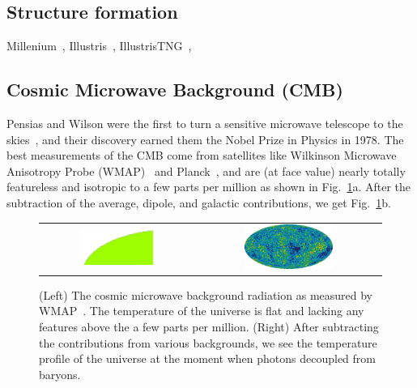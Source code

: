 \subsection{Structure formation}

Millenium~\cite{Springel:2005nw}, Illustris~\cite{Genel:2014lma,Vogelsberger:2014dza,Sijacki:2014yfa}, IllustrisTNG~\cite{Pillepich:2017jle},

\subsection{Cosmic Microwave Background (CMB)}

Pensias and Wilson were the first to turn a sensitive microwave telescope to the skies~\cite{Penzias:1965a,Penzias:1965b}, and their discovery earned them the Nobel Prize in Physics in 1978. The best measurements of the CMB come from satellites like Wilkinson Microwave Anisotropy Probe (WMAP)~\cite{Bennett:2012zja} and Planck~\cite{Ade:2015xua}, and are (at face value) nearly totally featureless and isotropic to a few parts per million as shown in Fig.~\ref{fig:cmb}a. After the subtraction of the average, dipole, and galactic contributions, we get Fig.~\ref{fig:cmb}b.

\begin{figure}[htb]
    \begin{tabular}{cc}
    \includegraphics[width=0.5\textwidth]{figures/dm/cmb0} & \includegraphics[width=0.5\textwidth]{figures/dm/cmb3} \\
    \end{tabular}
    \caption{(Left) The cosmic microwave background radiation as measured by WMAP~\cite{Bennett:2012zja}. The temperature of the universe is flat and lacking any features above the a few parts per million. (Right) After subtracting the contributions from various backgrounds, we see the temperature profile of the universe at the moment when photons decoupled from baryons.}\label{fig:cmb}
\end{figure}

